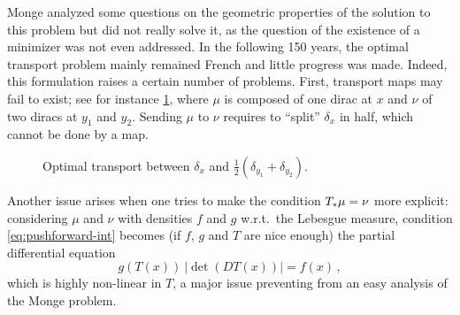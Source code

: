         Monge analyzed some questions on the geometric properties of the solution to this problem but did not really solve it, as the question of the existence of a minimizer was not even addressed. In the following 150 years, the optimal transport problem mainly remained French and little progress was made. Indeed, this formulation raises a certain number of problems. First, transport maps may fail to exist; see for instance \cref{fig:diracs}, where $\mu$ is composed of one dirac at $x$ and $\nu$ of two diracs at $y_1$ and $y_2$. Sending $\mu$ to $\nu$ requires to ``split'' $\delta_x$ in half, which cannot be done by a map.
        \begin{figure}[!h]
            \centering
            
            \caption{Optimal transport between $\delta_x$ and $\frac12(\delta_{y_1}+\delta_{y_2})$.}
            \label{fig:diracs}
        \end{figure}

        \noindent Another issue arises when one tries to make the condition $T_*\mu=\nu$ more explicit: considering $\mu$ and $\nu$ with densities $f$ and $g$ w.r.t.~the Lebesgue measure, condition \cref{eq:pushforward-int} becomes (if $f$, $g$ and $T$ are nice enough) the partial differential equation
        \begin{equation}
            g(T(x))\ |\!\det(DT(x))|=f(x)\,,
        \end{equation}
        which is highly non-linear in $T$, a major issue preventing from an easy analysis of the Monge problem.

